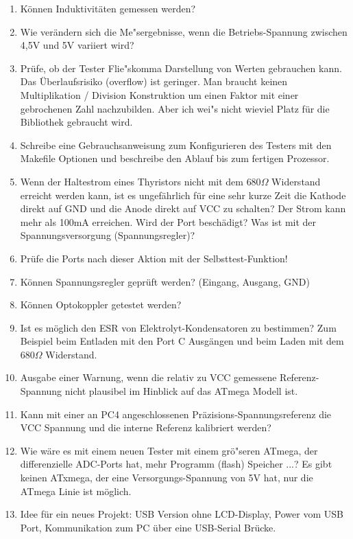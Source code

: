 \begin{enumerate}
\item K\"onnen Induktivit\"aten gemessen werden?
\item Wie ver\"andern sich die Me"sergebnisse, wenn die Betriebs-Spannung zwischen 4,5V und 5V variiert wird?
\item Pr\"ufe, ob der Tester Flie"skomma Darstellung von Werten gebrauchen kann.
Das \"Uberlaufsrisiko (overflow) ist geringer.
Man braucht keinen Multiplikation / Division Konstruktion um einen Faktor mit einer gebrochenen Zahl nachzubilden.
Aber ich wei"s nicht wieviel Platz f\"ur die Bibliothek gebraucht wird.
\item Schreibe eine Gebrauchsanweisung zum Konfigurieren des Testers mit den Makefile Optionen und beschreibe
den Ablauf bis zum fertigen Prozessor.
\item Wenn der Haltestrom eines Thyristors nicht mit dem \(680\Omega\) Widerstand erreicht werden kann, 
ist es ungef\"ahrlich f\"ur eine sehr kurze Zeit die Kathode direkt auf GND und die Anode direkt auf VCC zu schalten?
Der Strom kann mehr als 100mA erreichen. Wird der Port besch\"adigt? Was ist mit der Spannungsversorgung (Spannungsregler)?
\item Pr\"ufe die Ports nach dieser Aktion mit der Selbsttest-Funktion!
\item K\"onnen Spannungsregler gepr\"uft werden? (Eingang, Ausgang, GND)
\item K\"onnen Optokoppler getestet werden?
\item Ist es m\"oglich den ESR von Elektrolyt-Kondensatoren zu bestimmen? Zum Beispiel beim Entladen mit den Port C Ausg\"angen und beim
Laden mit dem \(680\Omega\) Widerstand.
\item Ausgabe einer Warnung, wenn die relativ zu VCC gemessene Referenz-Spannung nicht plausibel im Hinblick auf das ATmega Modell ist.
\item Kann mit einer an PC4 angeschlossenen Pr\"azisions-Spannungsreferenz die VCC Spannung und die interne Referenz kalibriert werden?
\item Wie w\"are es mit einem neuen Tester mit einem gr\"o"seren ATmega, der differenzielle ADC-Ports hat,
mehr Programm (flash) Speicher ...?
Es gibt keinen ATxmega, der eine Versorgungs-Spannung von 5V hat, nur die ATmega Linie ist m\"oglich.
\item Idee f\"ur ein neues Projekt: USB  Version ohne LCD-Display, Power vom USB Port, Kommunikation zum PC \"uber eine USB-Serial Br\"ucke.
\end{enumerate}
